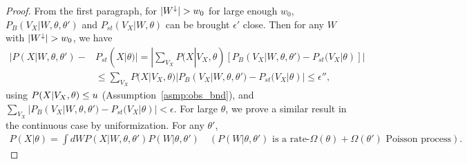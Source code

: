 \begin{proof}
From the first paragraph, for ${|W^\downarrow}| > w_{0}$ for 
large enough $w_0$,
$P_B(V_X | W, \theta, \theta')$ and  $P_{st}(V_X | W, \theta)$ can be
brought $\epsilon'$ close.
Then for any $W$ with ${|W^\downarrow}| > w_0$, we have
\begin{align*}
  |P(X|W , \theta, \theta') - & P_{st}(X | \theta)| = | \sum_{V_X} P(X|V_X, \theta) [P_B(V_X | W, \theta, \theta') -  P_{st}(V_X | \theta) ]|\\
& \leq \sum_{V_X} P(X | V_X, \theta)|P_B(V_X | W, \theta, \theta') -  P_{st}(V_X | \theta)|\le \epsilon'',
\end{align*}
using $P(X|V_X,\theta) \le u$ 
(Assumption~\ref{asmp:obs_bnd}), and 
$\sum_{V_X} |P_B(V_X | W, \theta, \theta') -  P_{st}(V_X | \theta)| < \epsilon$.
For large $\theta$, we prove a similar result in the continuous 
case by uniformization. For any $\theta'$,
\begin{align*}
P(X | \theta) %
= \int dW P(X | W, \theta, \theta') P(W | \theta, \theta') %
\quad 
(\text{$P(W|\theta,\theta')$ is a rate-$\Omega(\theta) + 
\Omega(\theta')$ Poisson process}).
\end{align*}

\end{proof}
